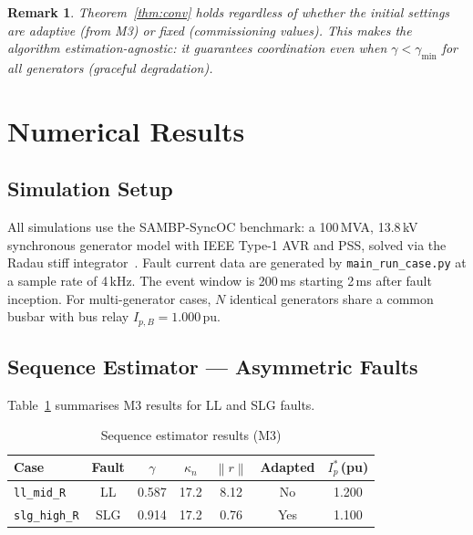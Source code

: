\documentclass[journal,twoside,10pt]{IEEEtran}
\newtheorem{remark}{Remark}
\newcommand{\norm}[1]{\left\|#1\right\|}
\begin{document}
\begin{remark}
Theorem~\ref{thm:conv} holds regardless of whether the initial settings
are adaptive (from M3) or fixed (commissioning values).
This makes the algorithm \emph{estimation-agnostic}: it guarantees
coordination even when $\gamma < \gamma_{\min}$ for all generators
(\emph{graceful degradation}).
\end{remark}

\section{Numerical Results}
\label{sec:results}

\subsection{Simulation Setup}
\label{sec:results:setup}

All simulations use the SAMBP-SyncOC benchmark: a 100\,MVA,
13.8\,kV synchronous generator model with IEEE Type-1 AVR and PSS,
solved via the Radau stiff integrator~\cite{Virtanen2020}.
Fault current data are generated by \texttt{main\_run\_case.py} at
a sample rate of 4\,kHz.  The event window is 200\,ms starting 2\,ms
after fault inception.
For multi-generator cases, $N$ identical generators share a common busbar
with bus relay $I_{p,B} = 1.000$\,pu.

\subsection{Sequence Estimator — Asymmetric Faults}
\label{sec:results:seq}

Table~\ref{tab:seq_results} summarises M3 results for LL and SLG faults.

\begin{table}[!t]
  \renewcommand{\arraystretch}{1.2}
  \caption{Sequence estimator results (M3)}
  \label{tab:seq_results}
  \centering
  \begin{tabular}{lcccccc}
    \toprule
    Case & Fault & $\gamma$ & $\kappa_n$ & $\norm{r}$ & Adapted & $I_p^*$\,(pu) \\
    \midrule
    \texttt{ll\_mid\_R}  & LL  & 0.587 & 17.2 & 8.12 & No  & 1.200 \\
    \texttt{slg\_high\_R}& SLG & 0.914 & 17.2 & 0.76 & Yes & 1.100 \\
    \bottomrule
  \end{tabular}
\end{table}
\end{document}
